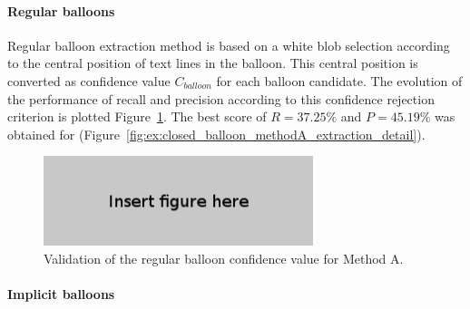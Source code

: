 \paragraph{Regular balloons} %
\label{par:regular_balloons}

Regular balloon extraction method is based on a white blob selection according to the central position of text lines in the balloon.
This central position is converted as confidence value $C_{balloon}$ for each balloon candidate.
The evolution of the performance of recall and precision according to this confidence rejection criterion is plotted Figure~\ref{fig:ex:validation_confidence_balloon_methodA_regular}.
The best score of $R=37.25\%$ and $P=45.19\%$ was obtained for  (Figure~\ref{fig:ex:closed_balloon_methodA_extraction_detail}).


\begin{figure}[h]
  \centering
 \includegraphics[width=0.7\textwidth]{figure_here.png}
 \caption{Validation of the regular balloon confidence value for Method A.
 }
 \label{fig:ex:validation_confidence_balloon_methodA_regular}
\end{figure}






\paragraph{Implicit balloons} %
\label{par:ex:implicit_balloons_reminder}

